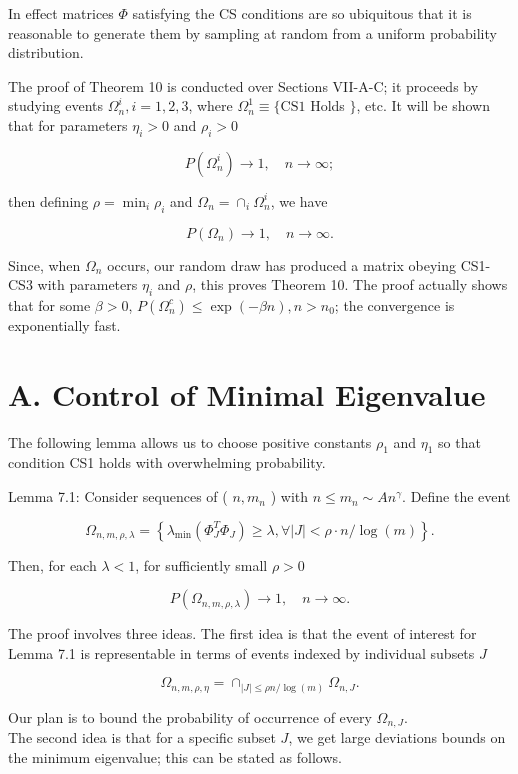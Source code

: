 \documentclass[10pt]{article}
\begin{document}
In effect matrices $\Phi$ satisfying the CS conditions are so ubiquitous that it is reasonable to generate them by sampling at random from a uniform probability distribution.

The proof of Theorem 10 is conducted over Sections VII-A-C; it proceeds by studying events $\Omega_{n}^{i}, i=1,2,3$, where $\Omega_{n}^{1} \equiv\{\mathrm{CS} 1$ Holds $\}$, etc. It will be shown that for parameters $\eta_{i}>0$ and $\rho_{i}>0$

$$
P\left(\Omega_{n}^{i}\right) \rightarrow 1, \quad n \rightarrow \infty ;
$$

then defining $\rho=\min _{i} \rho_{i}$ and $\Omega_{n}=\cap_{i} \Omega_{n}^{i}$, we have

$$
P\left(\Omega_{n}\right) \rightarrow 1, \quad n \rightarrow \infty .
$$

Since, when $\Omega_{n}$ occurs, our random draw has produced a matrix obeying CS1-CS3 with parameters $\eta_{i}$ and $\rho$, this proves Theorem 10. The proof actually shows that for some $\beta>0$, $P\left(\Omega_{n}^{c}\right) \leq \exp (-\beta n), n>n_{0}$; the convergence is exponentially fast.

\section*{A. Control of Minimal Eigenvalue}
The following lemma allows us to choose positive constants $\rho_{1}$ and $\eta_{1}$ so that condition CS1 holds with overwhelming probability.

Lemma 7.1: Consider sequences of ( $n, m_{n}$ ) with $n \leq m_{n} \sim A n^{\gamma}$. Define the event

$$
\Omega_{n, m, \rho, \lambda}=\left\{\lambda_{\min }\left(\Phi_{J}^{T} \Phi_{J}\right) \geq \lambda, \forall|J|<\rho \cdot n / \log (m)\right\} .
$$

Then, for each $\lambda<1$, for sufficiently small $\rho>0$

$$
P\left(\Omega_{n, m, \rho, \lambda}\right) \rightarrow 1, \quad n \rightarrow \infty .
$$

The proof involves three ideas. The first idea is that the event of interest for Lemma 7.1 is representable in terms of events indexed by individual subsets $J$

$$
\Omega_{n, m, \rho, \eta}=\cap_{|J| \leq \rho n / \log (m)} \Omega_{n, J} .
$$

Our plan is to bound the probability of occurrence of every $\Omega_{n, J}$.\\
The second idea is that for a specific subset $J$, we get large deviations bounds on the minimum eigenvalue; this can be stated as follows.
\end{document}
